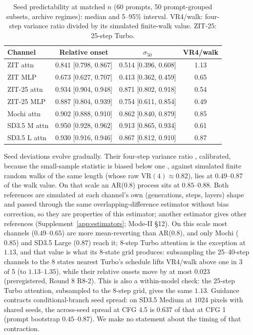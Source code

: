 \documentclass[11pt]{article}
\newcommand{\TT}{ZIT-25}%
\begin{document}
\begin{table}[htbp]
\centering\small
\caption{Seed predictability at matched $n$ (60 prompts, 50 prompt-grouped subsets, archive regimes): median and 5--95\% interval. VR4/walk: four-step variance ratio divided by its simulated finite-walk value. \TT{}: 25-step Turbo.}
\label{tab:seed}
\begin{tabular}{lccc}
\toprule
Channel & Relative onset & $\sigma_{50}$ & VR4/walk\\
\midrule
ZIT attn & 0.841 [0.798, 0.867] & 0.514 [0.396, 0.608] & 1.13\\
ZIT MLP & 0.673 [0.627, 0.707] & 0.413 [0.362, 0.459] & 0.65\\
\TT{} attn & 0.934 [0.904, 0.948] & 0.871 [0.802, 0.918] & 0.54\\
\TT{} MLP & 0.887 [0.804, 0.939] & 0.754 [0.611, 0.854] & 0.49\\
Mochi attn & 0.902 [0.888, 0.910] & 0.862 [0.840, 0.879] & 0.85\\
SD3.5 M attn & 0.950 [0.928, 0.962] & 0.913 [0.865, 0.934] & 0.61\\
SD3.5 L attn & 0.930 [0.916, 0.946] & 0.867 [0.812, 0.910] & 0.87\\
\bottomrule
\end{tabular}
\end{table}

Seed deviations evolve gradually. Their four-step variance ratio \citep{lo1988stock}, calibrated, because the small-sample statistic is biased below one \citep{kim1991mean,lo1989size}, against simulated finite random walks of the same length (whose raw $\mathrm{VR}(4)\approx0.82$), lies at $0.49$--$0.87$ of the walk value. On that scale an AR(0.8) process sits at $0.85$--$0.88$. Both references are simulated at each channel's own (generations, steps, layers) shape and passed through the same overlapping-difference estimator without bias correction, so they are properties of this estimator; another estimator gives other references (Supplement~\ref{app:estimators}; Mode-II \S12). On this scale most channels ($0.49$--$0.65$) are more mean-reverting than AR(0.8), and only Mochi ($0.85$) and SD3.5 Large ($0.87$) reach it; 8-step Turbo attention is the exception at $1.13$, and that value is what its 8-state grid produces: subsampling the 25--40-step channels to the 8 states nearest Turbo's schedule lifts VR4/walk above one in 3 of 5 (to $1.13$--$1.35$), while their relative onsets move by at most $0.023$ (preregistered, Round 8 R8-2). This is also a within-model check: the 25-step Turbo attention, subsampled to the 8-step grid, gives the same $1.13$. Guidance contracts conditional-branch seed spread: on SD3.5 Medium at $1024$ pixels with shared seeds, the across-seed spread at CFG 4.5 is $0.637$ of that at CFG 1 (prompt bootstrap $0.45$--$0.87$). We make no statement about the timing of that contraction.
\end{document}
